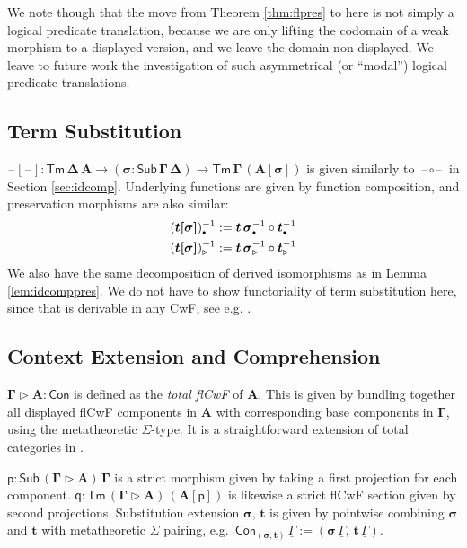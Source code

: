 \documentclass{article}
\theoremstyle{definition}
\theoremstyle{theorem}
\newcommand{\Con}{\mathsf{Con}}
\newcommand{\Sub}{\mathsf{Sub}}
\newcommand{\Tm}{\mathsf{Tm}}
\newcommand{\blank}{\mathord{\hspace{1pt}\text{--}\hspace{1pt}}}
\newcommand{\ra}{\rightarrow}
\newcommand{\ext}{\triangleright}
\newcommand{\emptycon}{\scaleobj{.75}\bullet}
\newcommand{\p}{\mathsf{p}}
\newcommand{\q}{\mathsf{q}}
\newcommand{\bGamma}{\boldsymbol{\Gamma}}
\newcommand{\bsigma}{\boldsymbol{\sigma}}
\newcommand{\bt}{\boldsymbol{t}}
\newcommand{\bA}{\boldsymbol{A}}
\newcommand{\ul}[1]{\underline{#1}}
\newcommand{\ulGamma}{\ul{\Gamma}}
\begin{document}
We note though that the move from Theorem \ref{thm:flpres} to here is not simply a
logical predicate translation, because we are only lifting the codomain of a
weak morphism to a displayed version, and we leave the domain non-displayed. We
leave to future work the investigation of such asymmetrical (or
``modal'') logical predicate translations.

\subsection{Term Substitution}
$\boldsymbol{\blank[\blank] : \Tm\,\Delta\,A \ra (\sigma : \Sub\,\Gamma\,\Delta)
  \ra \Tm\,\Gamma\,(A[\sigma])}$ is given similarly to
$\boldsymbol{\blank\circ\blank}$ in Section \ref{sec:idcomp}. Underlying functions
are given by function composition, and preservation morphisms are also similar:
\begin{alignat*}{3}
  & (\boldsymbol{t[\sigma]})_{\emptycon}^{-1} :=
    \bt\,\bsigma_{\emptycon}^{-1} \circ \bt_{\emptycon}^{-1} \\
  & (\boldsymbol{t[\sigma]})_{\ext}^{-1} :=
    \bt\,\bsigma_{\ext}^{-1} \circ \bt_{\ext}^{-1}
\end{alignat*}
We also have the same decomposition of derived isomorphisms as in Lemma
\ref{lem:idcomppres}. We do not have to show functoriality of term substitution
here, since that is derivable in any CwF, see e.g. \cite{kaposi2019constructing}.

\subsection{Context Extension and Comprehension}

$\boldsymbol{\Gamma \ext A : \Con}$ is defined as the \emph{total flCwF} of
$\bA$. This is given by bundling together all displayed flCwF components in
$\bA$ with corresponding base components in $\bGamma$, using the metatheoretic
$\Sigma$-type. It is a straightforward extension of total categories in
\cite{displayedcats}.

$\boldsymbol{\p : \Sub\,(\Gamma\ext A)\,\Gamma}$ is a strict morphism given by
taking a first projection for each component. $\boldsymbol{\q : \Tm\,(\Gamma\ext
  A)\,(A[\p])}$ is likewise a strict flCwF section given by second
projections. Substitution extension $\boldsymbol{\sigma,\,t}$ is given by
pointwise combining $\bsigma$ and $\bt$ with metatheoretic $\Sigma$ pairing,
e.g.\ $\Con_{\boldsymbol{(\sigma,t)}}\,\ulGamma :=
(\bsigma\,\ulGamma,\,\bt\,\ulGamma)$.
\end{document}
